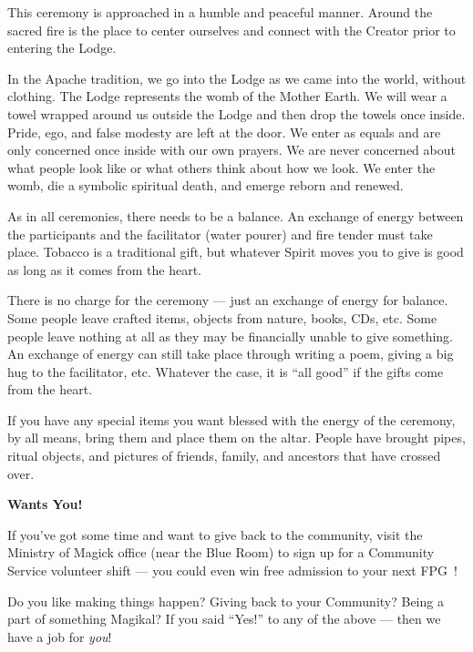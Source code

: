 \documentclass[9pt,twoside,openright,final,article]{memoir}
\def\fpg{{\beltanefamily FPG\ }}
\renewcommand{\subsection}[1]{%
  \vspace{6pt}%
  \needspace{1.25in}%
  \begin{center}\textbf{\Large \beltanefamily #1}\end{center}

  \nopagebreak}
\begin{document}
\begin{multicols}{2}
  This ceremony is approached in a humble and peaceful manner. Around
  the sacred fire is the place to center ourselves and connect with
  the Creator prior to entering the Lodge.

  In the Apache tradition, we go into the Lodge as we came into the
  world, without clothing.  The Lodge represents the womb of the
  Mother Earth. We will wear a towel wrapped around us outside the
  Lodge and then drop the towels once inside. Pride, ego, and false
  modesty are left at the door. We enter as equals and are only
  concerned once inside with our own prayers. We are never concerned
  about what people look like or what others think about how we
  look. We enter the womb, die a symbolic spiritual death, and emerge
  reborn and renewed.

  As in all ceremonies, there needs to be a balance. An exchange of
  energy between the participants and the facilitator (water pourer)
  and fire tender must take place. Tobacco is a traditional gift, but
  whatever Spirit moves you to give is good as long as it comes from
  the heart.

  There is no charge for the ceremony --- just an exchange of energy
  for balance. Some people leave crafted items, objects from nature,
  books, CDs, etc. Some people leave nothing at all as they may be
  financially unable to give something. An exchange of energy can
  still take place through writing a poem, giving a big hug to the
  facilitator, etc. Whatever the case, it is ``all good'' if the gifts
  come from the heart.

  If you have any special items you want blessed with the energy of
  the ceremony, by all means, bring them and place them on the
  altar. People have brought pipes, ritual objects, and pictures of
  friends, family, and ancestors that have crossed over.



  \subsection{\fpg Wants You!}

  If you've got some time and want to give back to the community, visit
  the Ministry of Magick office (near the Blue Room) to sign up for a
  Community Service volunteer shift --- you could even win free
  admission to your next \fpg!

  Do you like making things happen? Giving back to your Community?
  Being a part of something Magikal? If you said ``Yes!'' to any of
  the above --- then we have a job for \emph{you}!


\end{multicols}
\end{document}
